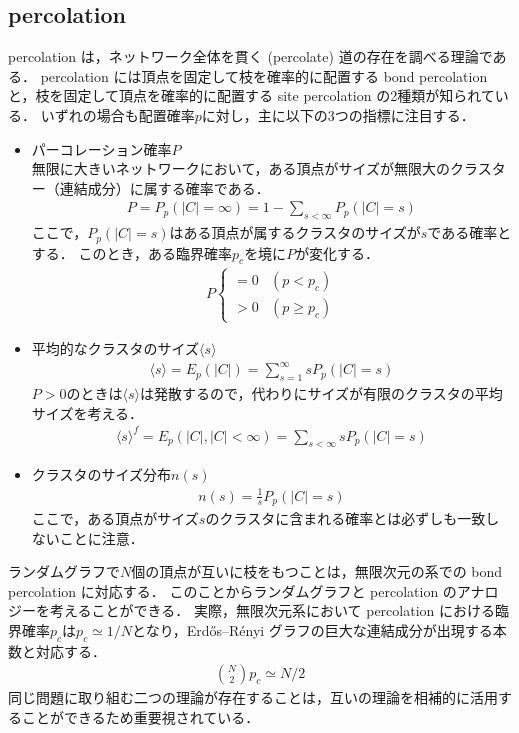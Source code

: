 \documentclass[../main]{subfiles}
\begin{document}
\subsection{percolation}
percolation は，ネットワーク全体を貫く (percolate) 道の存在を調べる理論である．
percolation には頂点を固定して枝を確率的に配置する bond percolation と，枝を固定して頂点を確率的に配置する site percolation の2種類が知られている．
いずれの場合も配置確率$p$に対し，主に以下の3つの指標に注目する．
\begin{itemize}
    \item パーコレーション確率$P$\\
        無限に大きいネットワークにおいて，ある頂点がサイズが無限大のクラスター（連結成分）に属する確率である．
        \begin{align*}
            P=P_p(|C|=\infty)=1-\sum_{s<\infty}P_p(|C|=s)
        \end{align*} 
        ここで，$P_p(|C|=s)$はある頂点が属するクラスタのサイズが$s$である確率とする．
        このとき，ある臨界確率$p_c$を境に$P$が変化する．
        \begin{align*}
            P
            \begin{cases}
                = 0 & (p<p_c)\\
                > 0 & (p\geq p_c)
            \end{cases}
        \end{align*}
    \item 平均的なクラスタのサイズ$\langle s \rangle$
        \begin{align*}
            \langle s\rangle =E_p(|C|)=\sum_{s=1}^\infty sP_p(|C|=s)
        \end{align*}
        $P>0$のときは$\langle s\rangle$は発散するので，代わりにサイズが有限のクラスタの平均サイズを考える．
        \begin{align*}
            \langle s\rangle^f =E_p(|C|,|C|<\infty)=\sum_{s<\infty} sP_p(|C|=s)            
        \end{align*}
    \item クラスタのサイズ分布$n(s)$
    \begin{align*}
        n(s)=\frac{1}{s}P_p(|C|=s)
    \end{align*}
    ここで，ある頂点がサイズ$s$のクラスタに含まれる確率とは必ずしも一致しないことに注意．
\end{itemize}

ランダムグラフで$N$個の頂点が互いに枝をもつことは，無限次元の系での bond percolation に対応する．
このことからランダムグラフと percolation のアナロジーを考えることができる．
実際，無限次元系において percolation における臨界確率$p_c$は$p_c\simeq 1/N$となり，Erdős–Rényi グラフの巨大な連結成分が出現する本数と対応する．
\begin{align*}
    \binom{N}{2}p_c\simeq N/2
\end{align*}
同じ問題に取り組む二つの理論が存在することは，互いの理論を相補的に活用することができるため重要視されている．
\end{document}
